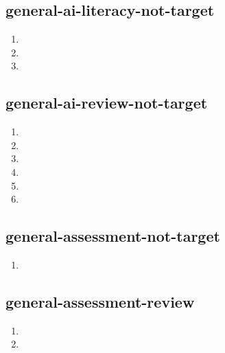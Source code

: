 \documentclass{article}
\begin{document}
\subsection{general-ai-literacy-not-target}
\begin{enumerate}
\item {}
\item {}
\item {}
\end{enumerate}

\subsection{general-ai-review-not-target}
\begin{enumerate}
\item {}
\item {}
\item {}
\item {}
\item {}
\item {}
\end{enumerate}

\subsection{general-assessment-not-target}
\begin{enumerate}
\item {}
\end{enumerate}

\subsection{general-assessment-review}
\begin{enumerate}
\item {}
\item {}
\end{enumerate}
\end{document}
